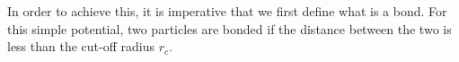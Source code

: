 \documentclass[../../main.tex]{subfiles}
\begin{document}
    In order to achieve this, it is imperative that we first define what is a bond. For this simple potential, two particles are bonded if the distance between the two is less than the cut-off radius $r_c$.

\end{document}
